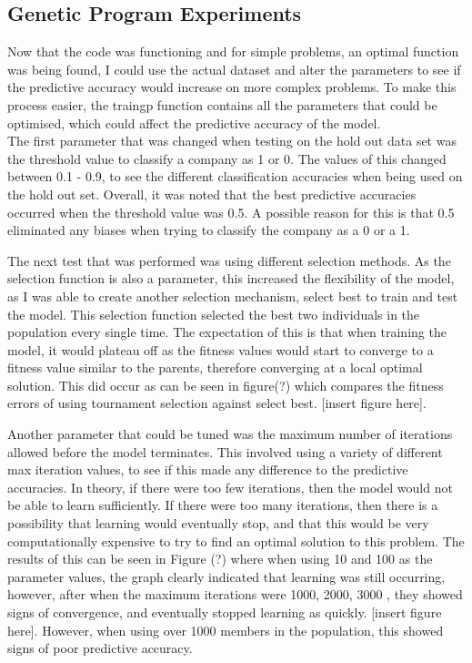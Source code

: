 \documentclass[11pt]{article}
\begin{document}
\subsection{Genetic Program Experiments}
Now that the code was functioning and for simple problems, an optimal function was being found, I could use the actual dataset and alter the parameters to see if the predictive accuracy would increase on more complex problems. To make this process easier, the train\textunderscore gp function contains all the parameters that could be optimised, which could affect the predictive accuracy of the model. \\

The first parameter that was changed when testing on the hold out data set was the threshold value to classify a company as 1 or 0. The values of this changed between 0.1 - 0.9, to see the different classification accuracies when being used on the hold out set. Overall, it was noted that the best predictive accuracies occurred when the threshold value was 0.5. A possible reason for this is that 0.5 eliminated any biases when trying to classify the company as a 0 or a 1.

The next test that was performed was using different selection methods. As the selection function is also a parameter, this increased the flexibility of the model, as I was able to create another selection mechanism, select best to train and test the model. This selection function selected the best two individuals in the population every single time. The expectation of this is that when training the model, it would plateau off as the fitness values would start to converge to a fitness value similar to the parents, therefore converging at a local optimal solution. This did occur as can be seen in figure(?) which compares the fitness errors of using tournament selection against select best. [insert figure here].

Another parameter that could be tuned was the maximum number of iterations allowed before the model terminates. This involved using a variety of different max iteration values, to see if this made any difference to the predictive accuracies. In theory, if there were too few iterations, then the model would not be able to learn sufficiently. If there were too many iterations, then there is a possibility that learning would eventually stop, and that this would be very computationally expensive to try to find an optimal solution to this problem. The results of this can be seen in Figure (?) where when using 10 and 100 as the parameter values, the graph clearly indicated that learning was still occurring, however, after when the maximum iterations were 1000, 2000, 3000 , they showed signs of convergence, and eventually stopped learning as quickly. [insert figure here]. However, when using over 1000 members in the population, this showed signs of poor predictive  accuracy.
\end{document}

